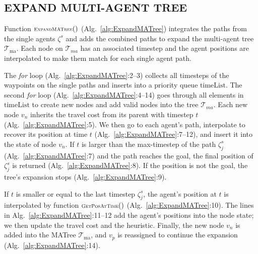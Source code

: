 \documentclass[letterpaper, 10 pt, conference]{ieeeconf}  %
\newcommand{\Symbol}[1]{\ensuremath{\mathcal{#1}}}
\newcommand{\Function}[1]{\ensuremath{{\scriptstyle{{\textsc{#1}}}}}}
\newcommand{\Var}[1]{\ensuremath{{{\mathrm{#1}}}}}
\newcommand{\Traj}{\ensuremath{\zeta}}
\newcommand{\Tree}{\Symbol{T}}
\begin{document}

\subsection{EXPAND MULTI-AGENT TREE}
Function $\Function{ExpandMATree}()$ (Alg.~\ref{alg:ExpandMATree}) integrates the paths from the single agents $\Traj^s$ and adds the combined paths to expand the multi-agent tree $\Tree_\Var{ma}$.
Each node on $\Tree_{ma}$ has an associated timestep and the agent positions are interpolated to make them match for each single agent path.

The \emph{for} loop (Alg.~\ref{alg:ExpandMATree}:2--3) collects all timesteps of the waypoints on the single paths and inserts into a priority queue $\Var{timeList}$. 
The second \emph{for} loop (Alg.~\ref{alg:ExpandMATree}:4--14) goes through all elements in $\Var{timeList}$ to create new nodes and add valid nodes into the tree $\Tree_{ma}$.
Each new node $v_n$ inherits the travel cost from its parent with timestep $t$ (Alg.~\ref{alg:ExpandMATree}:5). We then go to each agent's path, interpolate to recover its position at time $t$ (Alg.~\ref{alg:ExpandMATree}:7--12), and insert it into the state of node $v_n$.
If $t$ is larger than the max-timestep of the path $\Traj^s_j$ (Alg.~\ref{alg:ExpandMATree}:7) and the path reaches the goal, the final position of $\Traj^s_j$ is returned (Alg.~\ref{alg:ExpandMATree}:8). If the position is not the goal, the tree's expansion stops (Alg.~\ref{alg:ExpandMATree}:9).

If $t$ is smaller or equal to the last timestep $\Traj^s_j$, the agent's position at $t$ is interpolated by function $\Function{GetPosAtTime}()$ (Alg.~\ref{alg:ExpandMATree}:10). The lines in Alg.~\ref{alg:ExpandMATree}:11--12 add the agent's positions into the node state; we then update the travel cost and the heuristic. 
Finally, the new node $v_n$ is added into the MATree $\Tree_\Var{ma}$, and $v_p$ is reassigned to continue the expansion (Alg.~\ref{alg:ExpandMATree}:14).
\end{document}
